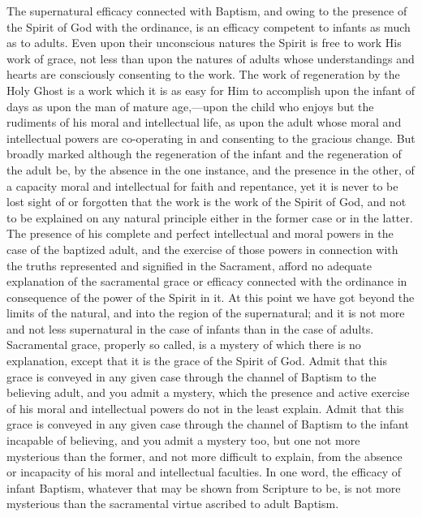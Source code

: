 \documentclass[]{book}
\begin{document}
The supernatural efficacy connected with Baptism, and owing to the presence of the Spirit of God with the ordinance, is an efficacy competent to infants as much as to adults. Even upon their unconscious natures the Spirit is free to work His work of grace, not less than upon the natures of adults whose understandings and hearts are consciously consenting to the work. The work of regeneration by the Holy Ghost is a work which it is as easy for Him to accomplish upon the infant of days as upon the man of mature age,---upon the child who enjoys but the rudiments of his moral and intellectual life, as upon the adult whose moral and intellectual powers are co-operating in and consenting to the gracious change. But broadly marked although the regeneration of the infant and the regeneration of the adult be, by the absence in the one instance, and the presence in the other, of a capacity moral and intellectual for faith and repentance, yet it is never to be lost sight of or forgotten that the work is the work of the Spirit of God, and not to be explained on any natural principle either in the former case or in the latter. The presence of his complete and perfect intellectual and moral powers in the case of the baptized adult, and the exercise of those powers in connection with the truths represented and signified in the Sacrament, afford no adequate explanation of the sacramental grace or efficacy connected with the ordinance in consequence of the power of the Spirit in it. At this point we have got beyond the limits of the natural, and into the region of the supernatural; and it is not more and not less supernatural in the case of infants than in the case of adults. Sacramental grace, properly so called, is a mystery of which there is no explanation, except that it is the grace of the Spirit of God. Admit that this grace is conveyed in any given case through the channel of Baptism to the believing adult, and you admit a mystery, which the presence and active exercise of his moral and intellectual powers do not in the least explain. Admit that this grace is conveyed in any given case through the channel of Baptism to the infant incapable of believing, and you admit a mystery too, but one not more mysterious than the former, and not more difficult to explain, from the absence or incapacity of his moral and intellectual faculties. In one word, the efficacy of infant Baptism, whatever that may be shown from Scripture to be, is not more mysterious than the sacramental virtue ascribed to adult Baptism.
\end{document}

